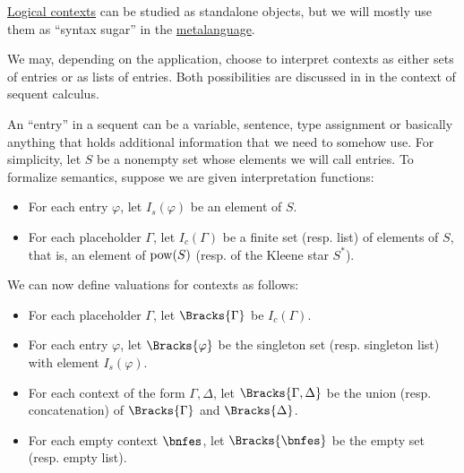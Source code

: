 \begin{remark}\label{rem:logical_context_semantics}
  \hyperref[def:logical_context]{Logical contexts} can be studied as standalone objects, but we will mostly use them as \enquote{syntax sugar} in the \hyperref[con:metalogic]{metalanguage}.

  We may, depending on the application, choose to interpret contexts as either sets of entries or as lists of entries. Both possibilities are discussed in  in the context of sequent calculus.

  An \enquote{entry} in a sequent can be a variable, sentence, type assignment or basically anything that holds additional information that we need to somehow use. For simplicity, let \( S \) be a nonempty set whose elements we will call entries. To formalize semantics, suppose we are given interpretation functions:
  \begin{itemize}
    \item For each entry \( \varphi \), let \( I_s(\varphi) \) be an element of \( S \).
    \item For each placeholder \( \Gamma \), let \( I_c(\Gamma) \) be a finite set (resp. list) of elements of \( S \), that is, an element of \( \operatorname{pow}(S) \) (resp. of the Kleene star \( S^* \)).
  \end{itemize}

  We can now define valuations for contexts as follows:
  \begin{itemize}
    \item For each placeholder \( \Gamma \), let \( \Bracks{\Gamma} \) be \( I_c(\Gamma) \).
    \item For each entry \( \varphi \), let \( \Bracks{\varphi} \) be the singleton set (resp. singleton list) with element \( I_s(\varphi) \).
    \item For each context of the form \( \Gamma, \Delta \), let \( \Bracks{\Gamma, \Delta} \) be the union (resp. concatenation) of \( \Bracks{\Gamma} \) and \( \Bracks{\Delta} \).
    \item For each empty context \( \bnfes \), let \( \Bracks{\bnfes} \) be the empty set (resp. empty list).
  \end{itemize}
\end{remark}

